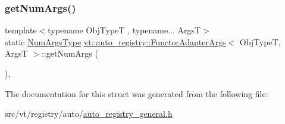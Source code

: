 \subsubsection{\texorpdfstring{get\+Num\+Args()}{getNumArgs()}}
{\footnotesize\ttfamily template$<$typename Obj\+TypeT , typename... ArgsT$>$ \\
static \hyperlink{namespacevt_1_1auto__registry_aebda1d9d765bc9147dc654ad0712c936}{Num\+Args\+Type} \hyperlink{structvt_1_1auto__registry_1_1_functor_adapter_args}{vt\+::auto\+\_\+registry\+::\+Functor\+Adapter\+Args}$<$ Obj\+TypeT, ArgsT $>$\+::get\+Num\+Args (\begin{DoxyParamCaption}{ }\end{DoxyParamCaption})\hspace{0.3cm}{\ttfamily [inline]}, {\ttfamily [static]}}



The documentation for this struct was generated from the following file\+:\begin{DoxyCompactItemize}
\item 
src/vt/registry/auto/\hyperlink{auto__registry__general_8h}{auto\+\_\+registry\+\_\+general.\+h}\end{DoxyCompactItemize}
